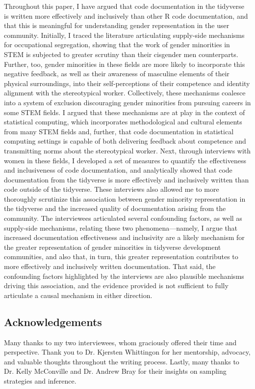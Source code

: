 Throughout this paper, I have argued that code documentation in the tidyverse is written more effectively and inclusively than other R code documentation, and that this is meaningful for understanding gender representation in the user community. Initially, I traced the literature articulating supply-side mechanisms for occupational segregation, showing that the work of gender minorities in STEM is subjected to greater scrutiny than their cisgender men counterparts. Further, too, gender minorities in these fields are more likely to incorporate this negative feedback, as well as their awareness of masculine elements of their physical surroundings, into their self-perceptions of their competence and identity alignment with the stereotypical worker. Collectively, these mechanisms coalesce into a system of exclusion discouraging gender minorities from pursuing careers in some STEM fields. I argued that these mechanisms are at play in the context of statistical computing, which incorporates methodological and cultural elements from many STEM fields and, further, that code documentation in statistical computing settings is capable of both delivering feedback about competence and transmitting norms about the stereotypical worker. Next, through interviews with women in these fields, I developed a set of measures to quantify the effectiveness and inclusiveness of code documentation, and analytically showed that code documentation from the tidyverse is more effectively and inclusively written than code outside of the tidyverse. These interviews also allowed me to more thoroughly scrutinize this association between gender minority representation in the tidyverse and the increased quality of documentation arising from the community. The interviewees articulated several confounding factors, as well as supply-side mechanisms, relating these two phenomena---namely, I argue that increased documentation effectiveness and inclusivity are a likely mechanism for the greater representation of gender minorities in tidyverse development communities, and also that, in turn, this greater representation contributes to more effectively and inclusively written documentation. That said, the confounding factors highlighted by the interviews are also plausible mechanisms driving this association, and the evidence provided is not sufficient to fully articulate a causal mechanism in either direction. 


\subsection*{Acknowledgements}

Many thanks to my two interviewees, whom graciously offered their time and perspective. Thank you to Dr. Kjersten Whittingon for her mentorship, advocacy, and valuable thoughts throughout the writing process. Lastly, many thanks to Dr. Kelly McConville and Dr. Andrew Bray for their insights on sampling strategies and inference. 